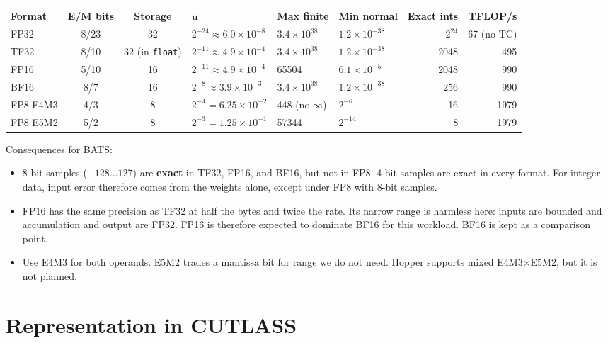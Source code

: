 \documentclass[10pt,letterpaper]{article}
\newcommand{\ur}{\mathbf{u}}
\begin{document}
\begin{center}
\small
\begin{tabular}{@{}l c c l l l r r@{}}
  \toprule
  \textbf{Format} & \textbf{E/M bits} & \textbf{Storage} & $\ur$ & \textbf{Max finite} & \textbf{Min normal} & \textbf{Exact ints} & \textbf{TFLOP/s} \\
  \midrule
  FP32       & 8/23 & 32 & $2^{-24} \approx 6.0\times10^{-8}$ & $3.4\times10^{38}$ & $1.2\times10^{-38}$ & $2^{24}$ & 67 (no TC) \\
  TF32       & 8/10 & 32 (in \texttt{float}) & $2^{-11} \approx 4.9\times10^{-4}$ & $3.4\times10^{38}$ & $1.2\times10^{-38}$ & 2048 & 495 \\
  FP16       & 5/10 & 16 & $2^{-11} \approx 4.9\times10^{-4}$ & 65504 & $6.1\times10^{-5}$ & 2048 & 990 \\
  BF16       & 8/7  & 16 & $2^{-8} \approx 3.9\times10^{-3}$ & $3.4\times10^{38}$ & $1.2\times10^{-38}$ & 256 & 990 \\
  FP8 E4M3   & 4/3  & 8  & $2^{-4} = 6.25\times10^{-2}$ & 448 (no $\infty$) & $2^{-6}$ & 16 & 1979 \\
  FP8 E5M2   & 5/2  & 8  & $2^{-3} = 1.25\times10^{-1}$ & 57344 & $2^{-14}$ & 8 & 1979 \\
  \bottomrule
\end{tabular}
\end{center}

Consequences for BATS:
\begin{itemize}
  \item 8-bit samples ($-128 \ldots 127$) are \textbf{exact} in TF32, FP16, and BF16, but not in FP8. 4-bit samples are exact in every format. For integer data, input error therefore comes from the weights alone, except under FP8 with 8-bit samples.
  \item FP16 has the same precision as TF32 at half the bytes and twice the rate. Its narrow range is harmless here: inputs are bounded and accumulation and output are FP32. FP16 is therefore expected to dominate BF16 for this workload. BF16 is kept as a comparison point.
  \item Use E4M3 for both operands. E5M2 trades a mantissa bit for range we do not need. Hopper supports mixed E4M3$\times$E5M2, but it is not planned.
\end{itemize}

\section{Representation in CUTLASS}
\end{document}
